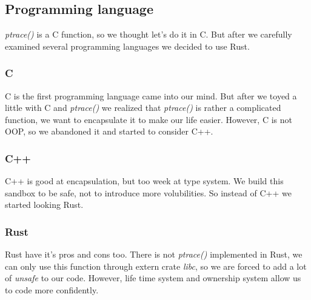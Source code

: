 \documentclass[conference,compsoc]{IEEEtran}
\begin{document}
	\subsection{Programming language}

		\par 
			\emph{ptrace()} is a C function, so we thought let's do it in C. 
			But after we carefully examined several programming languages we decided to use Rust.
		\subsubsection{C}
			\par
				C is the first programming language came into our mind. 
				But after we toyed a little with C and \emph{ptrace()} we realized that \emph{ptrace()} is rather a complicated function, we want to encapsulate it to make our life easier. 
				However, C is not OOP, so we abandoned it and started to consider C++.
		\subsubsection{C++}
			\par
				C++ is good at encapsulation, but too week at type system. 
				We build this sandbox to be safe, not to introduce more volubilities. 
				So instead of C++ we started looking Rust.
		\subsubsection{Rust}
			\par
				Rust have it's pros and cons too. 
				There is not \emph{ptrace()} implemented in Rust, we can only use this function through extern crate \emph{libc}, so we are forced to add a lot of \emph{unsafe} to our code. 
				However, life time system and ownership system allow us to code more confidently.
\end{document}
